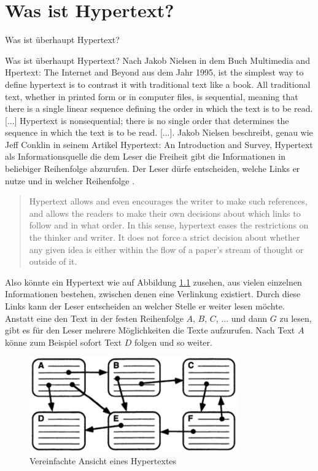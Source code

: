 \chapter{Was ist Hypertext?}
\label{ch:Was ist Hypertext?}

\begin{section}{Was ist überhaupt Hypertext?}
\label{sec:big_brother}

Was ist überhaupt Hypertext? Nach Jakob Nielsen in dem Buch Multimedia and Hpertext: The Internet and Beyond aus dem Jahr 1995, ist \glqq the simplest way to define hypertext is to contrast it with traditional text like a book. All traditional text, whether in printed form or in computer files, is sequential, meaning that there is a single linear sequence defining the order in which the text is to be read. [...] Hypertext is nonsequential; there is no single order that determines the sequence in which the text is to be read. [...]\grqq{ }\cite[S.1]{Nielsen1995}. Jakob Nielsen beschreibt, genau wie Jeff Conklin in seinem Artikel Hypertext: An Introduction and Survey, Hypertext als Informationsquelle die dem Leser die Freiheit gibt die Informationen in beliebiger Reihenfolge abzurufen. Der Leser dürfe entscheiden, welche Links er nutze und in welcher Reihenfolge \cite[S.33]{Conklin1987} \cite[S.1]{Nielsen1995}.

\begin{quote}
\glqq Hypertext allows and even encourages the writer to make such references, and allows the readers to make their own decisions about which links to follow and in what order. In this sense, hypertext eases the restrictions on the thinker and writer. It does not force a strict decision about whether any given idea is either within the flow of a paper's stream of thought or outside of it.\grqq{ }\cite[S.33]{Conklin1987}
\end{quote}

Also könnte ein Hypertext wie auf Abbildung \ref{fig:nielsenLink} zusehen, aus vielen einzelnen Informationen bestehen, zwischen denen eine Verlinkung existiert. Durch diese Links kann der Leser entscheiden an welcher Stelle er weiter lesen möchte. Anstatt eine den Text in der festen Reihenfolge $A$, $B$, $C$, $...$ und dann $G$ zu lesen, gibt es für den Leser mehrere Möglichkeiten die Texte aufzurufen. Nach Text $A$ könne zum Beispiel sofort Text $D$ folgen und so weiter\cite[S.1]{Nielsen1995}.

\begin{figure}[H]
	\centering
	\includegraphics[width=0.8\textwidth]{image/nielsenLink}
	\caption{Vereinfachte Ansicht eines Hypertextes \cite[S.1]{Nielsen1995}}
	\label{fig:nielsenLink}
\end{figure}


\end{section}
